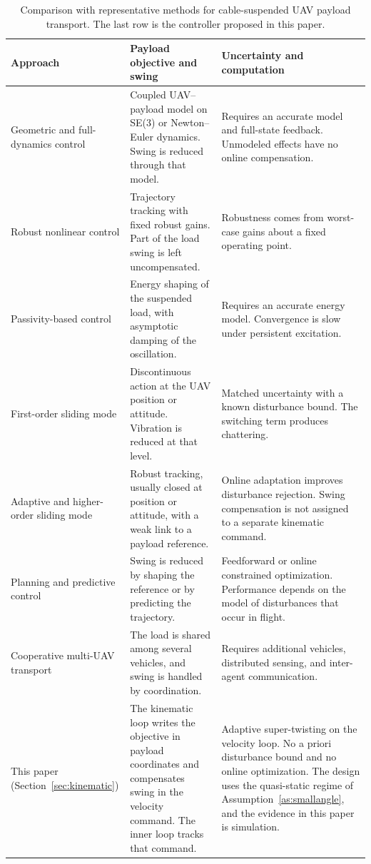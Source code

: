\documentclass[sn-mathphys-num]{sn-jnl}
\theoremstyle{thmstyleone}%
\theoremstyle{thmstyletwo}%
\theoremstyle{thmstylethree}%
\begin{document}
\begin{table}[ht]
\centering
\caption{Comparison with representative methods for cable-suspended UAV payload transport. The last row is the controller proposed in this paper.}
\label{tab:method_comparison}
\footnotesize
\setlength{\tabcolsep}{4pt}
\renewcommand{\arraystretch}{1.12}
\begin{tabular}{p{3.7cm} p{5.5cm} p{5.3cm}}
\toprule
\textbf{Approach} & \textbf{Payload objective and swing} & \textbf{Uncertainty and computation} \\
\midrule
Geometric and full-dynamics control \cite{goodarzi2014geometric,Estevez2024}
& Coupled UAV--payload model on SE(3) or Newton--Euler dynamics. Swing is reduced through that model.
& Requires an accurate model and full-state feedback. Unmodeled effects have no online compensation. \\
\addlinespace
Robust nonlinear control \cite{qian2019path,barikbin2019trajectory}
& Trajectory tracking with fixed robust gains. Part of the load swing is left uncompensated.
& Robustness comes from worst-case gains about a fixed operating point. \\
\addlinespace
Passivity-based control \cite{guerrero2015passivity}
& Energy shaping of the suspended load, with asymptotic damping of the oscillation.
& Requires an accurate energy model. Convergence is slow under persistent excitation. \\
\addlinespace
First-order sliding mode \cite{kusznir2020sliding}
& Discontinuous action at the UAV position or attitude. Vibration is reduced at that level.
& Matched uncertainty with a known disturbance bound. The switching term produces chattering. \\
\addlinespace
Adaptive and higher-order sliding mode \cite{Wang2023,Mohammadi2021,rao2024adaptive}
& Robust tracking, usually closed at position or attitude, with a weak link to a payload reference.
& Online adaptation improves disturbance rejection. Swing compensation is not assigned to a separate kinematic command. \\
\addlinespace
Planning and predictive control \cite{palunko2012trajectory,akhtar2022path,Yu2024}
& Swing is reduced by shaping the reference or by predicting the trajectory.
& Feedforward or online constrained optimization. Performance depends on the model of disturbances that occur in flight. \\
\addlinespace
Cooperative multi-UAV transport \cite{maza2009multi,michael2011cooperative,Costantini2024}
& The load is shared among several vehicles, and swing is handled by coordination.
& Requires additional vehicles, distributed sensing, and inter-agent communication. \\
\midrule
This paper (Section~\ref{sec:kinematic})
& The kinematic loop writes the objective in payload coordinates and compensates swing in the velocity command. The inner loop tracks that command.
& Adaptive super-twisting on the velocity loop. No a priori disturbance bound and no online optimization. The design uses the quasi-static regime of Assumption~\ref{as:smallangle}, and the evidence in this paper is simulation. \\
\bottomrule
\end{tabular}
\end{table}
\end{document}
